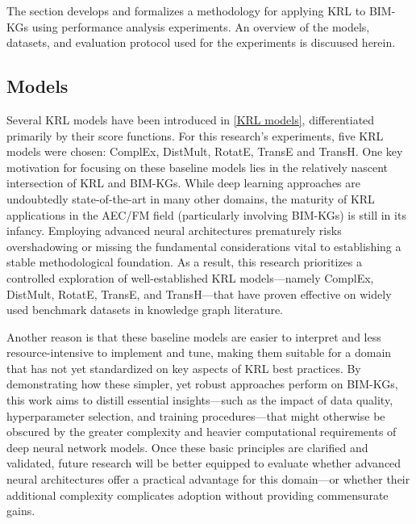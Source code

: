 The section develops and formalizes a methodology for applying \ac{KRL} to \acp{BIM-KG} using performance analysis experiments. An overview of the models, datasets, and evaluation protocol used for the experiments is discuused herein.

\subsection{Models}
Several \ac{KRL} models have been introduced in \autoref{KRL models}, differentiated primarily by their score functions. For this research's experiments, five \ac{KRL} models were chosen: ComplEx, DistMult, RotatE, TransE and TransH. One key motivation for focusing on these baseline models lies in the relatively nascent intersection of \ac{KRL} and \acp{BIM-KG}. While deep learning approaches are undoubtedly state-of-the-art in many other domains, the maturity of KRL applications in the \ac{AEC/FM} field (particularly involving \acp{BIM-KG}) is still in its infancy. Employing advanced neural architectures prematurely risks overshadowing or missing the fundamental considerations vital to establishing a stable methodological foundation. As a result, this research prioritizes a controlled exploration of well-established KRL models—namely ComplEx, DistMult, RotatE, TransE, and TransH—that have proven effective on widely used benchmark datasets in knowledge graph literature. 

Another reason is that these baseline models are easier to interpret and less resource-intensive to implement and tune, making them suitable for a domain that has not yet standardized on key aspects of \ac{KRL} best practices. By demonstrating how these simpler, yet robust approaches perform on \acp{BIM-KG}, this work aims to distill essential insights—such as the impact of data quality, hyperparameter selection, and training procedures—that might otherwise be obscured by the greater complexity and heavier computational requirements of deep neural network models. Once these basic principles are clarified and validated, future research will be better equipped to evaluate whether advanced neural architectures offer a practical advantage for this domain—or whether their additional complexity complicates adoption without providing commensurate gains.



